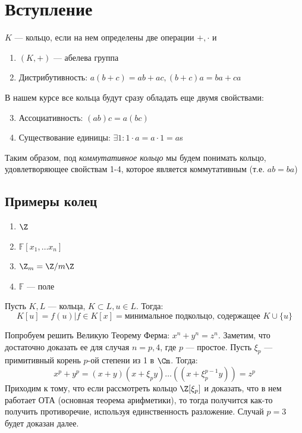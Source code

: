 

\section{Вступление}

\begin{definition}
    \(K\) --- кольцо, если на нем определены две операции \(+, \cdot\) и 
    \begin{enumerate}
        \item \((K, +)\) --- абелева группа
        \item Дистрибутивность: \(a(b + c) = ab + ac, (b + c)a = ba + ca\)
    \end{enumerate}
\end{definition}

В нашем курсе все кольца будут сразу обладать еще двумя свойствами:

\begin{enumerate}
    \setcounter{enumi}{2}
    \item Ассоциативность: \((ab)c = a(bc)\)
    \item Существование единицы: \(\exists 1: 1 \cdot a = a \cdot 1 = a\)s
\end{enumerate}

Таким образом, под \textit{коммутативное кольцо} мы будем понимать кольцо, удовлетворяющее свойствам 1-4, которое является коммутативным (т.е. \(ab = ba\))

\subsection{Примеры колец}
\begin{enumerate}
    \item \(\Z\)
    \item \(\mathbb{F}[x_1, \dots x_n]\)
    \item \(\Z_m = \Z/m\Z\)
    \item \(\mathbb{F}\) --- поле
\end{enumerate}

\begin{definition}
    Пусть \(K, L\) --- кольца, \(K \subset L, u \in L\). Тогда:
    \[K[u] = {f(u) | f \in K[x]} = \text{минимальное подкольцо, содержащее \(K \cup \{u\}\)}\]
\end{definition}

Попробуем решить Великую Теорему Ферма: \(x^n + y^n = z^n\). Заметим, что достаточно доказать ее для случая \(n = p, 4\), где \(p\) --- простое. Пусть \(\xi_p\) --- примитивный корень \(p\)-ой степени из 1 в \(\Cm\). Тогда:
\[x^p + y^p = (x + y)(x + \xi_py)\dots((x + \xi_p^{p - 1}y)) = z^p\]
Приходим к тому, что если рассмотреть кольцо \(\Z[\xi_p]\) и доказать, что в нем работает ОТА (основная теорема арифметики), то тогда получится как-то получить противоречие, используя единственность разложение. Случай \(p = 3\) будет доказан далее.

